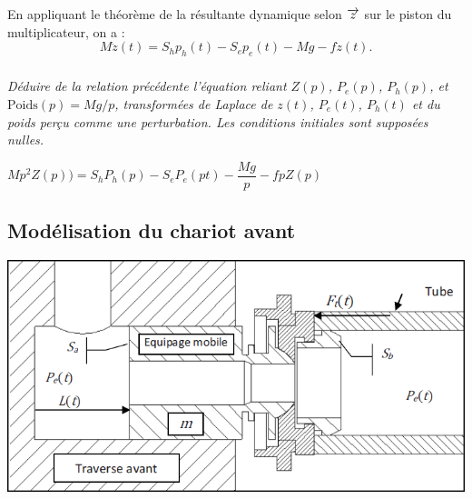 \documentclass[10pt,fleqn]{article} %
\begin{document}
\begin{multicols}{2}
En appliquant le théorème de la résultante dynamique selon $\overrightarrow{z}$ sur le piston du multiplicateur, on a : 
$$
M\ddot{z}(t)=S_hp_h(t)-S_ep_e(t)-Mg-f\dot{z}(t).
$$
\subparagraph{}
\textit{Déduire de la relation précédente l’équation reliant $Z(p)$, $P_e(p)$, $P_h(p)$, et $\text{Poids}(p)=Mg/p$, transformées de Laplace de $z(t)$, $P_e(t)$, $P_h(t)$ et du poids perçu comme une perturbation. Les conditions initiales sont supposées nulles.}
\ifprof
\begin{corrige}
$Mp^2 Z(p))=S_hP_h(p)-S_eP_e(pt)-\dfrac{Mg}{p}-fpZ(p)$
\end{corrige}
\else
\fi

\subsection*{Modélisation du chariot avant}


\ifprof
\else
\begin{center}
\includegraphics[width=.95\linewidth]{images_02/fig_03}
\end{center}



\end{multicols}
\end{document}
